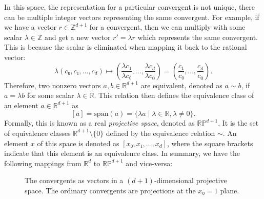 In this space, the representation for a particular convergent is not unique,
there can be multiple integer vectors representing the same convergent.
For example, if we have a vector $r ∈ ℤ^{d+1}$ for a convergent,
then we can multiply with some scalar $λ ∈ ℤ$ and get a new vector $r' = λ r$
which represents the same convergent.
This is because the scalar is eliminated when mapping it back to the rational vector:
\[
  λ (c₀, c₁, …, c_d)
  ↦ \left(\frac{λ c₁}{λ c₀}, …, \frac{λ c_d}{λ c_0} \right)
  = \left(\frac{c₁}{c₀}, …, \frac{c_d}{c_0} \right).
\]
Therefore, two nonzero vectors $a, b ∈ ℝ^{d+1}$ are equivalent,
denoted as $a \sim b$, if $a = λ b$ for some scalar $λ ∈ ℝ$.
This relation then defines the equivalence class of an element $a ∈ ℝ^{d+1}$ as
\[
  [a] = \mathrm{span}(a) = \{ λ a \mid λ ∈ ℝ, λ ≠ 0 \}.
\]
Formally, this is known as a real \emph{projective space}, denoted as $\mathbb{RP}^{d+1}$.
It is the set of equivalence classes $ℝ^{d+1} \setminus \{0\}$ defined by the
equivalence relation $\sim$.
An element $x$ of this space is denoted as $[x₀, x₁, …, x_d]$,
where the square brackets indicate that this element is an equivalence
class.
In summary, we have the following mappings from $ℝ^d$ to $\mathbb{RP}^{d+1}$
and vice-versa:

\begin{center}
\end{center}

\begin{figure}[tbp]
  \centering
  
  \caption{
    The convergents as vectors in a $(d+1)$-dimensional projective space.
    The ordinary convergents are projections at the $x₀ = 1$ plane.
  }
  \label{fig:projective-space}
\end{figure}

